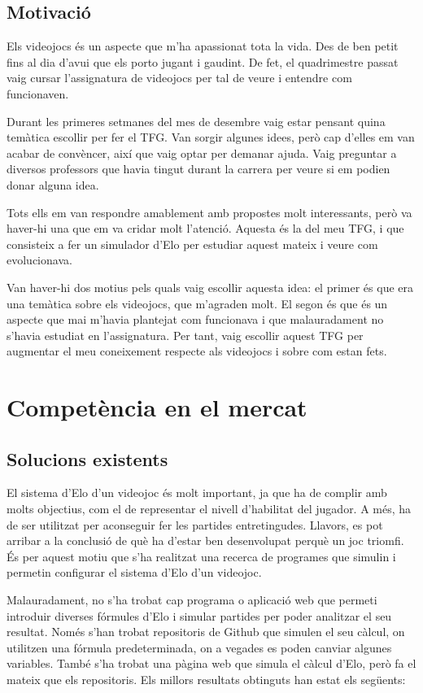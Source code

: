 \documentclass[a4paper]{article}
\begin{document}
\newpage
\subsection{Motivació}
Els videojocs és un aspecte que m'ha apassionat tota la vida. Des de ben petit fins al dia d'avui que els porto jugant i gaudint. De fet, el quadrimestre passat vaig cursar l'assignatura de videojocs per tal de veure i entendre com funcionaven.

Durant les primeres setmanes del mes de desembre vaig estar pensant quina temàtica escollir per fer el TFG. Van sorgir algunes idees, però cap d'elles em van acabar de convèncer, així que vaig optar per demanar ajuda. Vaig preguntar a diversos professors que havia tingut durant la carrera per veure si em podien donar alguna idea.

Tots ells em van respondre amablement amb propostes molt interessants, però va haver-hi una que em va cridar molt l'atenció. Aquesta és la del meu TFG, i que consisteix a fer un simulador d'Elo per estudiar aquest mateix i veure com evolucionava.

Van haver-hi dos motius pels quals vaig escollir aquesta idea: el primer és que era una temàtica sobre els videojocs, que m'agraden molt. El segon és que és un aspecte que mai m'havia plantejat com funcionava i que malauradament no s'havia estudiat en l'assignatura. Per tant, vaig escollir aquest TFG per augmentar el meu coneixement respecte als videojocs i sobre com estan fets.


\newpage
\section{Competència en el mercat}
\subsection{Solucions existents}
El sistema d'Elo d'un videojoc és molt important, ja que ha de complir amb molts objectius, com el de representar el nivell d'habilitat del jugador. A més, ha de ser utilitzat per aconseguir fer les partides entretingudes. Llavors, es pot arribar a la conclusió de què ha d'estar ben desenvolupat perquè un joc triomfi. És per aquest motiu que s'ha realitzat una recerca de programes que simulin i permetin configurar el sistema d'Elo d'un videojoc.

Malauradament, no s'ha trobat cap programa o aplicació web que permeti introduir diverses fórmules d'Elo i simular partides per poder analitzar el seu resultat. Només s'han trobat repositoris de Github que simulen el seu càlcul, on utilitzen una fórmula predeterminada, on a vegades es poden canviar algunes variables. També s'ha trobat una pàgina web que simula el càlcul d'Elo, però fa el mateix que els repositoris. Els millors resultats obtinguts han estat els següents:
\end{document}
